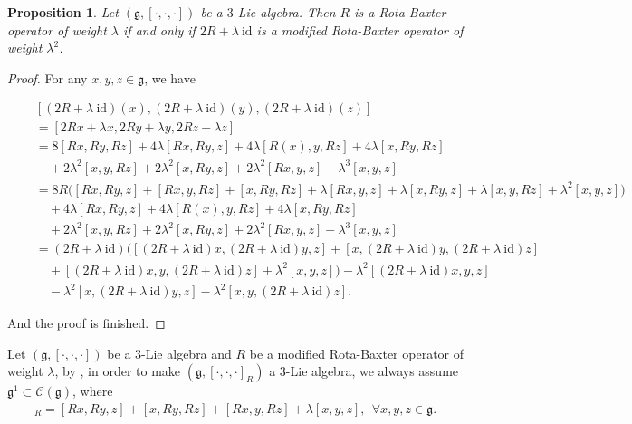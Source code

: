 \documentclass[12pt]{amsart}
\newtheorem{prop}[theorem]{Proposition}
\theoremstyle{definition}
\begin{document}
\begin{prop}
Let $(\mathfrak{g}, [\cdot, \cdot, \cdot])$ be a $3$-Lie algebra.  Then $R$ is a  Rota-Baxter operator of weight $\lambda$ if and only if  $ 2R+ \lambda~\mathrm{id}$ is a modified Rota-Baxter operator of weight $\lambda^2$.
\end{prop}
\begin{proof}
For any $x, y, z\in \mathfrak{g}$, we have
\begin{small}
\begin{align*}
& [(2R+\lambda~\mathrm{id})(x),  (2R+\lambda~\mathrm{id})(y), (2R+ \lambda~\mathrm{id})(z)]\\
\quad &=[2Rx+ \lambda x,  2Ry+ \lambda y, 2Rz+ \lambda z]\\
\quad &= 8[Rx, Ry, Rz]+4\lambda[Rx, Ry, z]+4\lambda[R(x), y, Rz]+4\lambda[x, Ry, Rz]\\
\quad &\quad+2\lambda^2[x, y, Rz]+2\lambda^2[x, Ry, z]+2\lambda^2[Rx, y, z]+\lambda^3[x, y, z]\\
\quad &= 8R\Big([Rx, Ry, z] + [Rx, y, Rz] + [x, Ry, Rz]+\lambda[Rx, y, z]+\lambda[x, Ry, z]+\lambda[x, y, Rz]+\lambda^2[x, y, z]\Big)\\
\quad &\quad+4\lambda[Rx, Ry, z]+4\lambda[R(x), y, Rz]+4\lambda[x, Ry, Rz]\\
\quad &\quad+2\lambda^2[x, y, Rz]+2\lambda^2[x, Ry, z]+2\lambda^2[Rx, y, z]+\lambda^3[x, y, z]\\
\quad &= (2R+\lambda~ \mathrm{id})\Big( [(2R+\lambda ~\mathrm{id})x, (2R+\lambda~ \mathrm{id})y, z]+[x, (2R+\lambda ~\mathrm{id})y, (2R+\lambda ~\mathrm{id})z]\\
\quad &\quad+[(2R+\lambda~\mathrm{id})x, y, (2R+ \lambda~\mathrm{id})z]+\lambda^2[x, y, z]\Big)-\lambda^2 [(2R+\lambda~\mathrm{id})x, y, z]\\
&\quad-\lambda^2[x, (2R+\lambda~\mathrm{id})y, z]-\lambda^2[x, y, (2R+\lambda ~\mathrm{id})z].
\end{align*}
\end{small}
And the proof is finished.
\end{proof}

 Let $(\mathfrak{g}, [\cdot, \cdot, \cdot])$ be a $3$-Lie algebra and  $R$ be a modified  Rota-Baxter operator of weight $\lambda$,  by \cite{HSZ23}, in order to make $(\mathfrak{g}, [\cdot, \cdot, \cdot]_R)$ a $3$-Lie algebra, we always assume $\mathfrak{g}^1\subset \mathcal{C}(\mathfrak{g})$, where
\begin{align}
[x, y, z]_R=[Rx, Ry, z]+[x, Ry, Rz]+[Rx, y, Rz]+\lambda[x, y, z],\ \ \forall x, y, z\in \mathfrak{g}. \label{3.2}
\end{align}
\end{document}
